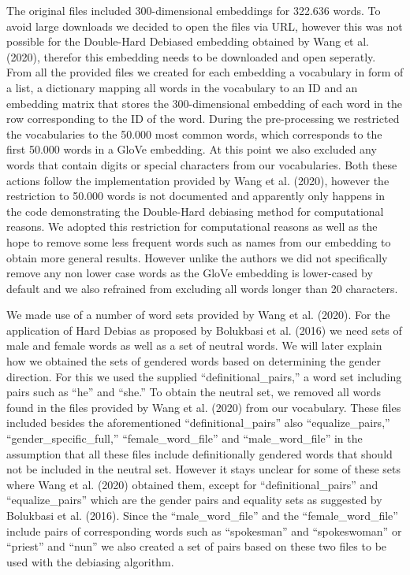 \documentclass[
  english,
  man,floatsintext]{apa6}
\begin{document}
The original files included 300-dimensional embeddings for 322.636 words. To avoid large downloads we decided to open the files via URL, however this was not possible for the Double-Hard Debiased embedding obtained by Wang et al. (2020), therefor this embedding needs to be downloaded and open seperatly. From all the provided files we created for each embedding a vocabulary in form of a list, a dictionary mapping all words in the vocabulary to an ID and an embedding matrix that stores the 300-dimensional embedding of each word in the row corresponding to the ID of the word. During the pre-processing we restricted the vocabularies to the 50.000 most common words, which corresponds to the first 50.000 words in a GloVe embedding. At this point we also excluded any words that contain digits or special characters from our vocabularies. Both these actions follow the implementation provided by Wang et al. (2020), however the restriction to 50.000 words is not documented and apparently only happens in the code demonstrating the Double-Hard debiasing method for computational reasons. We adopted this restriction for computational reasons as well as the hope to remove some less frequent words such as names from our embedding to obtain more general results. However unlike the authors we did not specifically remove any non lower case words as the GloVe embedding is lower-cased by default and we also refrained from excluding all words longer than 20 characters.

We made use of a number of word sets provided by Wang et al. (2020). For the application of Hard Debias as proposed by Bolukbasi et al. (2016) we need sets of male and female words as well as a set of neutral words. We will later explain how we obtained the sets of gendered words based on determining the gender direction. For this we used the supplied ``definitional\_pairs,'' a word set including pairs such as ``he'' and ``she.'' To obtain the neutral set, we removed all words found in the files provided by Wang et al. (2020) from our vocabulary. These files included besides the aforementioned ``definitional\_pairs'' also ``equalize\_pairs,'' ``gender\_specific\_full,'' ``female\_word\_file'' and ``male\_word\_file'' in the assumption that all these files include definitionally gendered words that should not be included in the neutral set. However it stays unclear for some of these sets where Wang et al. (2020) obtained them, except for ``definitional\_pairs'' and ``equalize\_pairs'' which are the gender pairs and equality sets as suggested by Bolukbasi et al. (2016). Since the ``male\_word\_file'' and the ``female\_word\_file'' include pairs of corresponding words such as ``spokesman'' and ``spokeswoman'' or ``priest'' and ``nun'' we also created a set of pairs based on these two files to be used with the debiasing algorithm.
\end{document}
